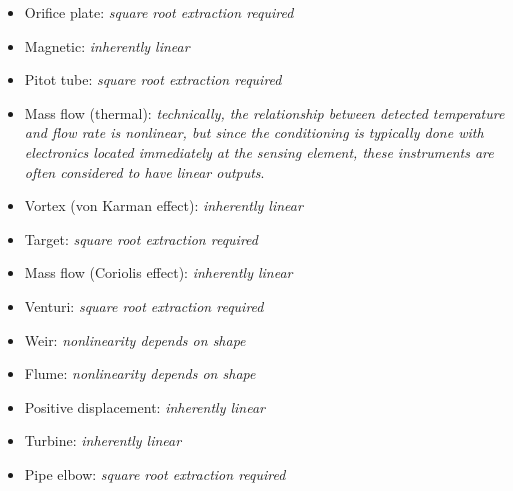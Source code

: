 \begin{itemize}
\item{} Orifice plate: {\it square root extraction required}
\vskip 5pt
\item{} Magnetic: {\it inherently linear}
\vskip 5pt
\item{} Pitot tube: {\it square root extraction required}
\vskip 5pt
\item{} Mass flow (thermal): {\it technically, the relationship between detected temperature and flow rate is nonlinear, but since the conditioning is typically done with electronics located immediately at the sensing element, these instruments are often considered to have linear outputs}.
\vskip 5pt
\item{} Vortex (von Karman effect): {\it inherently linear}
\vskip 5pt
\item{} Target: {\it square root extraction required}
\vskip 5pt
\item{} Mass flow (Coriolis effect): {\it inherently linear}
\vskip 5pt
\item{} Venturi: {\it square root extraction required}
\vskip 5pt
\item{} Weir: {\it nonlinearity depends on shape}
\vskip 5pt
\item{} Flume: {\it nonlinearity depends on shape}
\vskip 5pt
\item{} Positive displacement: {\it inherently linear}
\vskip 5pt
\item{} Turbine: {\it inherently linear}
\vskip 5pt
\item{} Pipe elbow: {\it square root extraction required}
\end{itemize}




